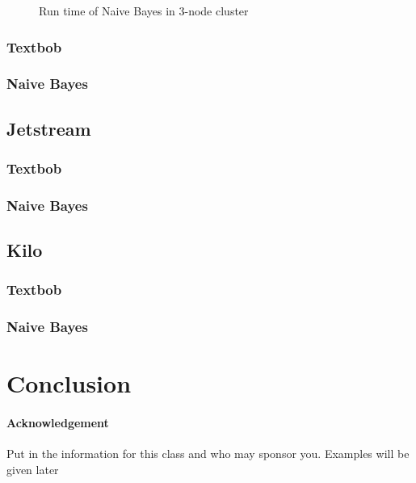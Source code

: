 \documentclass[9pt,twocolumn,twoside]{../../styles/osajnl}
\begin{document}
\begin{figure}[htbp]
\centering
{}
\caption{Run time of Naive Bayes in 3-node cluster}
\label{fig:chamstat3}
\end{figure}
\subsubsection{Textbob}
\subsubsection{Naive Bayes}
\subsection{Jetstream}
\subsubsection{Textbob}
\subsubsection{Naive Bayes}
\subsection{Kilo}
\subsubsection{Textbob}
\subsubsection{Naive Bayes}
\section{Conclusion}
\paragraph{Acknowledgement}

Put in the information for this class and who may sponsor
you. Examples will be given later

\end{document}
